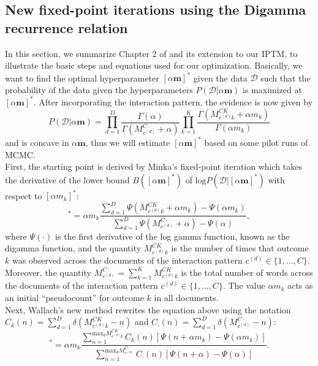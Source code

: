 \documentclass[a4paper]{article}
\begin{document}
\subsection{New fixed-point iterations using the Digamma recurrence relation}
In this section, we summarize Chapter 2 of \cite{wallach2008structured} and its extension to our IPTM, to illustrate the basic steps and equations used for our optimization. Basically, we want to find the optimal hyperparameter $[\alpha\boldsymbol{m}]^*$ given the data $\mathcal{D}$ such that the probability of the
data given the hyperparameters $P(\mathcal{D}|\alpha\boldsymbol{m})$ is maximized at $[\alpha\boldsymbol{m}]^*$. After incorporating the interaction pattern, the evidence is now given by 
\begin{equation}
P(\mathcal{D}|\alpha\boldsymbol{m})=\prod_{d=1}^{D} \frac{\Gamma(\alpha)}{\Gamma(M^{C\cdot}_{c^{(d)}}+\alpha)}\prod_{k=1}^{K}\frac{\Gamma(M^{CK}_{c^{(d)}k}+\alpha m_k)}{\Gamma(\alpha m_k)}
\end{equation} and is concave in $\alpha \boldsymbol{m}$, thus we will estimate $[\alpha\boldsymbol{m}]^*$ based on some pilot runs of MCMC.\\
\newline First, the starting point is derived by Minka’s fixed-point iteration which takes the derivative of the lower bound $B([\alpha\boldsymbol{m}]^*)$ of $\mbox{log}P(\mathcal{D}|[\alpha\boldsymbol{m}]^*)$ with respect to $[\alpha {m_k}]^*$:
\begin{equation}
[\alpha m_k]^*=\alpha m_k\frac{\sum_{d=1}^{D}\Psi(M^{CK}_{c^{(d)}k}+\alpha m_k)-\Psi(\alpha m_k)}{\sum_{d=1}^{D}\Psi(M^{C\cdot}_{c^{(d)}}+\alpha)-\Psi(\alpha)},
\end{equation}
where $\Psi(\cdot)$ is the first derivative of the log gamma function, known as the digamma function, and the quantity $M^{CK}_{c^{(d)}k}$ is the number of times that outcome $k$ was observed across the documents of the interaction pattern $c^{(d)} \in \{1,...,C\}$. Moreover, the quantity $M^{C\cdot}_{c^{(d)}}=\sum_{k=1}^KM^{CK}_{c^{(d)}k}$ is the total number of words across the documents of the interaction pattern $c^{(d)}\in \{1,...,C\}$. The
value $\alpha m_k$ acts as an initial “pseudocount” for outcome $k$ in all documents.\\ \newline
Next, Wallach's new method rewrites the equation above using the notation $C_k(n)=\sum_{d=1}^{D}\delta(M^{CK}_{c^{(d)}k}-n)$ and $C_\cdot(n)=\sum_{d=1}^{D}\delta(M^{C\cdot}_{c^{(d)}}-n)$:
\begin{equation}
[\alpha m_k]^*=\alpha m_k\frac{\sum_{n=1}^{\mbox{max}_dM^{CK}_{c^{(d)}k}}C_k(n)[\Psi(n+\alpha m_k)-\Psi(\alpha m_k)]}{\sum_{n=1}^{\mbox{max}_dM^{C\cdot}_{c^{(d)}}}C_\cdot(n)[\Psi(n+\alpha)-\Psi(\alpha)]}.
\end{equation}
\end{document}

